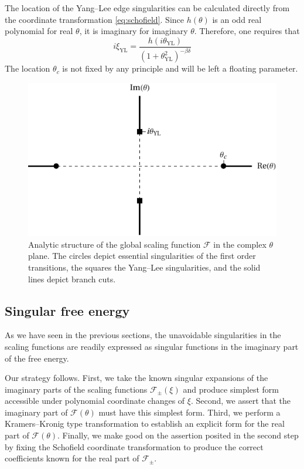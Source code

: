 \documentclass[
  aps,
  pre,
  preprint,
  longbibliography,
  floatfix
]{revtex4-2}
\begin{document}
The location of the Yang--Lee edge singularities can be calculated directly from the coordinate transformation \eqref{eq:schofield}. Since $h(\theta)$ is an odd real polynomial for real $\theta$, it is imaginary for imaginary $\theta$. Therefore, one requires that
\begin{equation}
  i\xi_{\mathrm{YL}}=\frac{h(i\theta_{\mathrm{YL}})}{(1+\theta_{\mathrm{YL}}^2)^{-\beta\delta}}
\end{equation}
The location $\theta_c$ is not fixed by any principle and will be left a floating parameter.

\begin{figure}
  \includegraphics{figs/F_theta_singularities.pdf}
  \caption{
    Analytic structure of the global scaling function $\mathcal F$ in the
    complex $\theta$ plane. The circles depict essential singularities of the
    first order transitions, the squares the Yang--Lee singularities, and the
    solid lines depict branch cuts.
  } \label{fig:schofield.singularities}
\end{figure}

\subsection{Singular free energy}

As we have seen in the previous sections, the unavoidable singularities in the
scaling functions are readily expressed as singular functions in the imaginary
part of the free energy.

Our strategy follows. First, we take the known singular expansions of the imaginary parts of the scaling functions $\mathcal F_{\pm}(\xi)$ and produce simplest form accessible under polynomial coordinate changes of $\xi$. Second, we assert that the imaginary part of $\mathcal F(\theta)$ must have this simplest form. Third, we perform a Kramers--Kronig type transformation to establish an explicit form for the real part of $\mathcal F(\theta)$. Finally, we make good on the assertion posited in the second step by fixing the Schofield coordinate transformation to produce the correct coefficients known for the real part of $\mathcal F_{\pm}$.
\end{document}
